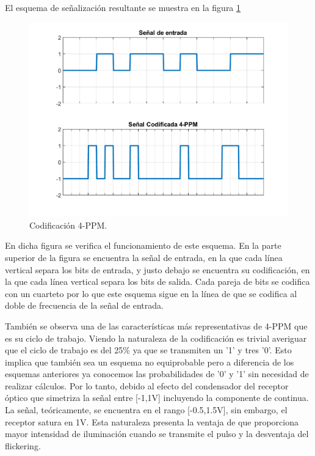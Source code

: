 El esquema de señalización resultante se muestra en la figura \ref{cod4ppm}
\begin{figure}[ht]
    \centering
    \includegraphics[scale=0.5]{./figuras/CodificadaPPM.pdf}%
    \caption{\small{Codificación 4-PPM.}}
    \label{cod4ppm}%
\end{figure}

En dicha figura se verifica el funcionamiento de este esquema. En la parte superior de la 
figura se encuentra la señal de entrada, en la que cada línea vertical separa los bits
de entrada, y justo debajo se encuentra su codificación, en la que cada línea vertical 
separa los bits de 
salida. Cada pareja de bits se codifica con un cuarteto por lo que este esquema sigue en 
la línea de que se codifica al doble de frecuencia de la señal de entrada.

También se observa una de las características más representativas de 4-PPM que es 
su ciclo de trabajo. Viendo la naturaleza de la codificación es trivial averiguar que 
el ciclo de trabajo es del 25\% ya que se transmiten un '1' y tres '0'. Esto implica que 
también sea un esquema no equiprobable pero a diferencia de los esquemas anteriores ya 
conocemos las probabilidades de '0' y '1' sin necesidad de realizar cálculos. Por lo 
tanto, debido al efecto del condensador del receptor óptico que simetriza la señal entre
[-1,1V] incluyendo la componente de continua. La señal, teóricamente, se encuentra en el 
rango [-0.5,1.5V], sin embargo, el receptor satura en 1V. Esta naturaleza presenta 
la ventaja de que proporciona mayor intensidad de iluminación cuando se transmite el 
pulso y la desventaja del flickering.

